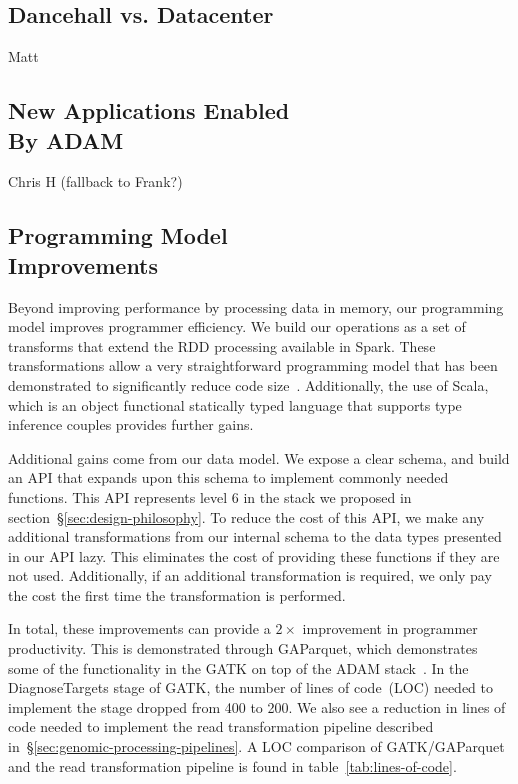 \documentclass[10pt,twocolumn]{article}
\begin{document}
\subsection{Dancehall vs. Datacenter}
\label{sec:dancehall-vs-datacenter}

Matt

\subsection{New Applications Enabled\\By ADAM}
\label{sec:new-applications}

Chris H (fallback to Frank?)

\subsection{Programming Model\\Improvements}
\label{sec:programming-model-improvements}

Beyond improving performance by processing data in memory, our programming model improves programmer efficiency.
We build our operations as a set of transforms that extend the RDD processing available in Spark. These transformations
allow a very straightforward programming model that has been demonstrated to significantly reduce code size~\cite{zaharia12}.
Additionally, the use of Scala, which is an object functional statically typed language that supports type inference couples
provides further gains.

Additional gains come from our data model. We expose a clear schema, and build an API that expands upon this schema
to implement commonly needed functions. This API represents level 6 in the stack we proposed in
section~\S\ref{sec:design-philosophy}. To reduce the cost of this API, we make any additional transformations from our
internal schema to the data types presented in our API lazy. This eliminates the cost of providing these functions if they are
not used. Additionally, if an additional transformation is required, we only pay the cost the first time the transformation is performed.

In total, these improvements can provide a $2\times$ improvement in programmer productivity. This is demonstrated through
GAParquet, which demonstrates some of the functionality in the GATK on top of the ADAM stack~\cite{gaparquet}. In the
DiagnoseTargets stage of GATK, the number of lines of code~(LOC) needed to implement the stage dropped from 400 to
200. We also see a reduction in lines of code needed to implement the read transformation pipeline described
in~\S\ref{sec:genomic-processing-pipelines}. A LOC comparison of GATK/GAParquet and the read transformation pipeline
is found in table~\ref{tab:lines-of-code}.
\end{document}
